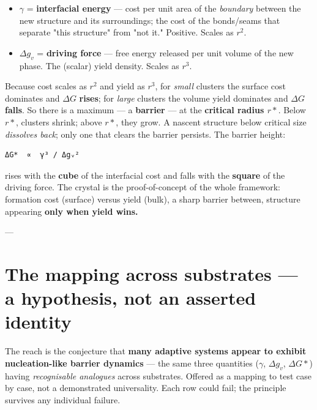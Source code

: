 \documentclass{article}
\begin{document}
\begin{itemize}
    \item $\gamma$ = \textbf{interfacial energy} --- cost per unit area of the \textit{boundary} between the new structure and its surroundings; the cost of the bonds/seams that separate "this structure" from "not it." Positive. Scales as $r^2$.
    \item $\Delta g_v$ = \textbf{driving force} --- free energy released per unit volume of the new phase. The (scalar) yield density. Scales as $r^3$.
\end{itemize}

Because cost scales as $r^2$ and yield as $r^3$, for \textit{small} clusters the surface cost dominates and $\Delta G$ \textbf{rises}; for \textit{large} clusters the volume yield dominates and $\Delta G$ \textbf{falls}. So there is a maximum --- a \textbf{barrier} --- at the \textbf{critical radius $r*$}. Below $r*$, clusters shrink; above $r*$, they grow. A nascent structure below critical size \textit{dissolves back}; only one that clears the barrier persists. The barrier height:

\begin{verbatim}
ΔG*  ∝  γ³ / Δgᵥ²
\end{verbatim}

rises with the \textbf{cube} of the interfacial cost and falls with the \textbf{square} of the driving force. The crystal is the proof-of-concept of the whole framework: formation cost (surface) versus yield (bulk), a sharp barrier between, structure appearing \textbf{only when yield wins.}

---

\section{The mapping across substrates --- a hypothesis, not an asserted identity}
The reach is the conjecture that \textbf{many adaptive systems appear to exhibit nucleation-like barrier dynamics} --- the same three quantities ($\gamma$, $\Delta g_v$, $\Delta G*$) having \textit{recognisable analogues} across substrates. Offered as a mapping to test case by case, not a demonstrated universality. Each row could fail; the principle survives any individual failure.
\end{document}

